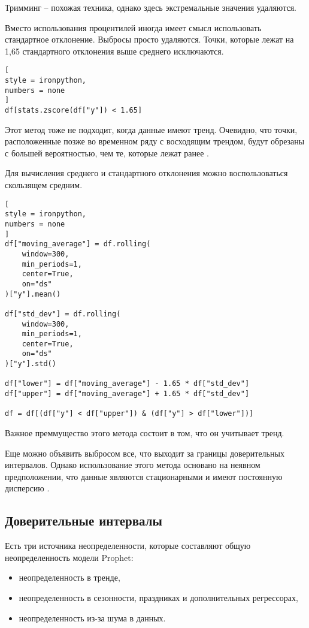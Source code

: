 \documentclass[%
	11pt,
	a4paper,
	utf8,
		]{article}
\begin{document}
Тримминг -- похожая техника, однако здесь экстремальные значения удаляются.

Вместо использования процентилей иногда имеет смысл использовать стандартное отклонение. Выбросы просто удаляются. Точки, которые лежат на 1,65 стандартного отклонения выше среднего исключаются.
\begin{lstlisting}[
style = ironpython,
numbers = none
]
df[stats.zscore(df["y"]) < 1.65]
\end{lstlisting}

Этот метод тоже не подходит, когда данные имеют тренд. Очевидно, что точки, расположенные позже во временном ряду с восходящим трендом, будут обрезаны с большей вероятностью, чем те, которые лежат ранее \cite[]{gruzdev:time-series-2022}.

Для вычисления среднего и стандартного отклонения можно воспользоваться скользящем средним.
\begin{lstlisting}[
style = ironpython,
numbers = none
]
df["moving_average"] = df.rolling(
    window=300,
    min_periods=1,
    center=True,
    on="ds"
)["y"].mean()

df["std_dev"] = df.rolling(
    window=300,
    min_periods=1,
    center=True,
    on="ds"
)["y"].std()

df["lower"] = df["moving_average"] - 1.65 * df["std_dev"]
df["upper"] = df["moving_average"] + 1.65 * df["std_dev"]

df = df[(df["y"] < df["upper"]) & (df["y"] > df["lower"])]
\end{lstlisting}

Важное преммущество этого метода состоит в том, что он учитывает тренд.

Еще можно объявить выбросом все, что выходит за границы доверительных интервалов. Однако использование этого метода основано на неявном предположении, что данные являются стационарными и имеют постоянную дисперсию \cite[]{gruzdev:time-series-2022}. 

\subsection{Доверительные интервалы}

Есть три источника неопределенности, которые составляют общую неопределенность модели Prophet:
\begin{itemize}
	\item неопределенность в тренде,
	
	\item неопределенность в сезонности, праздниках и дополнительных регрессорах,
	
	\item неопределенность из-за шума в данных.
\end{itemize}
\end{document}

